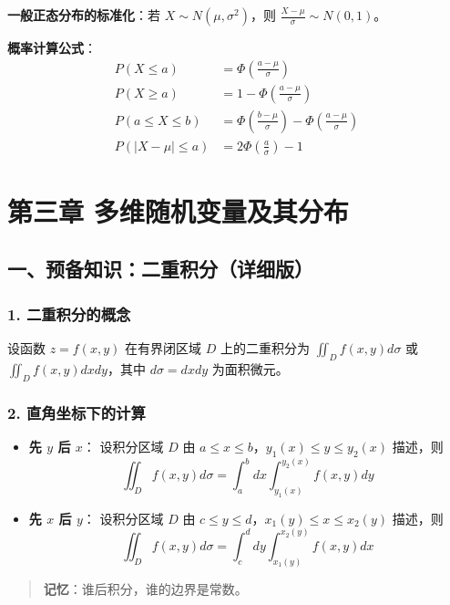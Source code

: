 \documentclass[12pt,a4paper]{ctexart}
\newenvironment{myquote}
  {\par\vspace{0.5em}\begin{quote}\sffamily\color{gray}}
  {\end{quote}\vspace{0.5em}}
\begin{document}
\textbf{一般正态分布的标准化}：若 $X \sim N(\mu, \sigma^2)$，则 $\frac{X - \mu}{\sigma} \sim N(0,1)$。

\textbf{概率计算公式}：
\begin{align*}
    P(X \le a)       & = \Phi\left(\frac{a-\mu}{\sigma}\right)                                         \\
    P(X \ge a)       & = 1 - \Phi\left(\frac{a-\mu}{\sigma}\right)                                     \\
    P(a \le X \le b) & = \Phi\left(\frac{b-\mu}{\sigma}\right) - \Phi\left(\frac{a-\mu}{\sigma}\right) \\
    P(|X-\mu| \le a) & = 2\Phi\left(\frac{a}{\sigma}\right) - 1
\end{align*}

\newpage
\section{第三章 多维随机变量及其分布}

\subsection{一、预备知识：二重积分（详细版）}

\subsubsection{1. 二重积分的概念}
设函数 $z = f(x,y)$ 在有界闭区域 $D$ 上的二重积分为 $\iint_D f(x,y) d\sigma$ 或 $\iint_D f(x,y) dx dy$，其中 $d\sigma = dx dy$ 为面积微元。

\subsubsection{2. 直角坐标下的计算}
\begin{itemize}[noitemsep]
    \item \textbf{先 $y$ 后 $x$}：
          设积分区域 $D$ 由 $a \le x \le b$，$y_1(x) \le y \le y_2(x)$ 描述，则
          \[
              \iint_D f(x,y) d\sigma = \int_a^b dx \int_{y_1(x)}^{y_2(x)} f(x,y) dy
          \]
    \item \textbf{先 $x$ 后 $y$}：
          设积分区域 $D$ 由 $c \le y \le d$，$x_1(y) \le x \le x_2(y)$ 描述，则
          \[
              \iint_D f(x,y) d\sigma = \int_c^d dy \int_{x_1(y)}^{x_2(y)} f(x,y) dx
          \]
\end{itemize}
\begin{myquote}
    \textbf{记忆}：谁后积分，谁的边界是常数。
\end{myquote}
\end{document}
